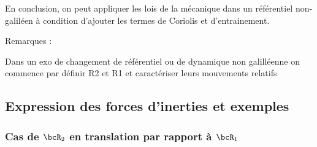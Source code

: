     En conclusion, on peut appliquer les lois de la mécanique dans un référentiel non-galiléen à condition d'ajouter les termes de Coriolis et d'entrainement.
    
    Remarques :
    \begin{enumerate}
        \itt Dans un exo de changement de référentiel ou de dynamique non galilléenne on commence par définir R2 et R1 et caractériser leurs mouvements relatifs
    \end{enumerate}
    
    \subsection{Expression des forces d'inerties et exemples}
    
    \subsubsection{Cas de $\bcR_2$ en translation par rapport à $\bcR_1$}



    
    
